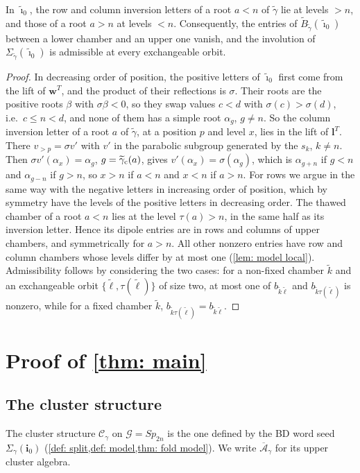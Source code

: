 \documentclass[a4paper]{amsart}
\numberwithin{equation}{section}
\theoremstyle{definition}
\theoremstyle{remark}
\newcommand{\mcG}{\mathcal{G}}
\newcommand{\mcC}{\mathcal{C}}
\newcommand{\oA}{\overline{\mathcal{A}}}
\newcommand{\bfi}{\mathbf{i}}
\newcommand{\tbfi}{\widetilde{\boldsymbol{\imath}}}
\newcommand{\tB}{\widetilde{B}}
\newcommand{\tg}{\widetilde{\gamma}}
\newcommand{\cc}{{\rm c}}
\newcommand{\Sp}{Sp_{2n}}
\begin{document}
\begin{lemma}
  \label{lem: split halves}
  In $\tbfi_0$, the row and column inversion letters of a root $a<n$ of $\tg$ lie at levels $>n$, and those of a root $a>n$ at levels $<n$.
  Consequently, the entries of $\tB_{\tg}(\tbfi_0)$ between a lower chamber and an upper one vanish, and the involution of $\Sigma_{\tg}(\tbfi_0)$ is admissible at every exchangeable orbit.
\end{lemma}
\begin{proof}
  In decreasing order of position, the positive letters of $\tbfi_0$ first come from the lift of $\mathbf w^T$, and the product of their reflections is $\sigma$.
  Their roots are the positive roots $\beta$ with $\sigma\beta<0$, so they swap values $c<d$ with $\sigma(c)>\sigma(d)$, i.e.\ $c\le n<d$, and none of them has a simple root $\alpha_g$, $g\neq n$.
  So the column inversion letter of a root $a$ of $\tg$, at a position $p$ and level $x$, lies in the lift of $\mathbf l^T$.
  There $v_{>p}=\sigma v'$ with $v'$ in the parabolic subgroup generated by the $s_k$, $k\neq n$.
  Then $\sigma v'(\alpha_x)=\alpha_g$, $g=\tg_{\cc}(a)$, gives $v'(\alpha_x)=\sigma(\alpha_g)$, which is $\alpha_{g+n}$ if $g<n$ and $\alpha_{g-n}$ if $g>n$, so $x>n$ if $a<n$ and $x<n$ if $a>n$.
  For rows we argue in the same way with the negative letters in increasing order of position, which by symmetry have the levels of the positive letters in decreasing order.
  The thawed chamber of a root $a<n$ lies at the level $\tau(a)>n$, in the same half as its inversion letter.
  Hence its dipole entries are in rows and columns of upper chambers, and symmetrically for $a>n$.
  All other nonzero entries have row and column chambers whose levels differ by at most one (\cref{lem: model local}).
  Admissibility follows by considering the two cases: for a non-fixed chamber $\widetilde{k}$ and an exchangeable orbit $\{\widetilde{\ell},\tau(\widetilde{\ell})\}$ of size two, at most one of $b_{\widetilde{k}\widetilde{\ell}}$ and $b_{\widetilde{k}\tau(\widetilde{\ell})}$ is nonzero, while for a fixed chamber $\widetilde{k}$, $b_{\widetilde{k}\tau(\widetilde{\ell})}=b_{\widetilde{k}\widetilde{\ell}}$.
\end{proof}

\section{Proof of \texorpdfstring{\cref{thm: main}}{the main theorem}}
\label{sec: main}
\subsection{The cluster structure}
\begin{definition}
  \label{def: C gamma}
  The cluster structure $\mcC_\gamma$ on $\mcG=\Sp$ is the one defined by the BD word seed $\Sigma_\gamma(\bfi_0)$ (\cref{def: split,def: model,thm: fold model}).
  We write $\oA_\gamma$ for its upper cluster algebra.
\end{definition}
\end{document}
